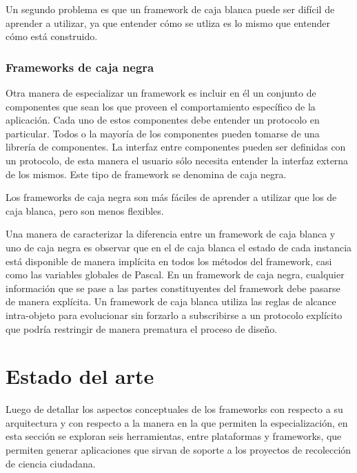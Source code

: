 	Un segundo problema es que un framework de caja blanca puede ser difícil de aprender a utilizar, ya que entender cómo se utliza es lo mismo que entender cómo está construido.\cite{johnson1988designing}
	
\subsubsection{Frameworks de caja negra}

	Otra manera de especializar un framework es incluir en él un conjunto de componentes que sean los que proveen el comportamiento específico de la aplicación. Cada uno de estos componentes debe entender un protocolo en particular. Todos o la mayoría de los componentes pueden tomarse de una librería de componentes. La interfaz entre componentes pueden ser definidas con un protocolo, de esta manera el usuario sólo necesita entender la interfaz externa de los mismos. Este tipo de framework se denomina de caja negra.
	
	Los frameworks de caja negra son más fáciles de aprender a utilizar que los de caja blanca, pero son menos flexibles. 
	
	Una manera de caracterizar la diferencia entre un framework de caja blanca y uno de caja negra es observar que en el de caja blanca el estado de cada instancia está disponible de manera implícita en todos los métodos del framework, casi como las variables globales de Pascal. En un framework de caja negra, cualquier información que se pase a las partes constituyentes del framework debe pasarse de manera explícita. Un framework de caja blanca utiliza las reglas de alcance intra-objeto para evolucionar sin forzarlo a subscribirse a un protocolo explícito que podría restringir de manera prematura el proceso de diseño.
 \cite{johnson1988designing}


\section{Estado del arte} \label{sec:estado_arte}
Luego de detallar los aspectos conceptuales de los frameworks con respecto a su arquitectura y con respecto a la manera en la que permiten la especialización, en esta sección se exploran seis herramientas, entre plataformas y frameworks, que permiten generar aplicaciones que sirvan de soporte a los proyectos de recolección de ciencia ciudadana. 

